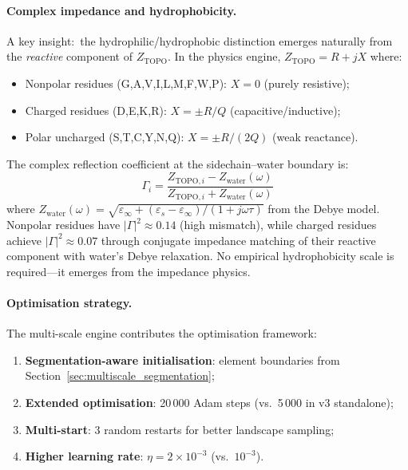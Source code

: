 \paragraph{Complex impedance and hydrophobicity.}
A key insight:\ the hydrophilic/hydrophobic distinction emerges naturally from the \emph{reactive} component of $Z_\text{TOPO}$.  In the physics engine, $Z_\text{TOPO} = R + jX$ where:
\begin{itemize}
    \item Nonpolar residues (G,A,V,I,L,M,F,W,P): $X = 0$ (purely resistive);
    \item Charged residues (D,E,K,R): $X = \pm R/Q$ (capacitive/inductive);
    \item Polar uncharged (S,T,C,Y,N,Q): $X = \pm R/(2Q)$ (weak reactance).
\end{itemize}
The complex reflection coefficient at the sidechain--water boundary is:
\begin{equation}
    \Gamma_i = \frac{Z_{\text{TOPO},i} - Z_\text{water}(\omega)}{Z_{\text{TOPO},i} + Z_\text{water}(\omega)}
    \label{eq:complex_gamma_hydro}
\end{equation}
where $Z_\text{water}(\omega) = \sqrt{\varepsilon_\infty + (\varepsilon_s - \varepsilon_\infty)/(1 + j\omega\tau)}$ from the Debye model.  Nonpolar residues have $|\Gamma|^2 \approx 0.14$ (high mismatch), while charged residues achieve $|\Gamma|^2 \approx 0.07$ through conjugate impedance matching of their reactive component with water's Debye relaxation.  No empirical hydrophobicity scale is required---it emerges from the impedance physics.

\paragraph{Optimisation strategy.}
The multi-scale engine contributes the optimisation framework:
\begin{enumerate}
    \item \textbf{Segmentation-aware initialisation}: element boundaries from Section~\ref{sec:multiscale_segmentation};
    \item \textbf{Extended optimisation}: 20\,000 Adam steps (vs.\ 5\,000 in v3 standalone);
    \item \textbf{Multi-start}: 3 random restarts for better landscape sampling;
    \item \textbf{Higher learning rate}: $\eta = 2 \times 10^{-3}$ (vs.\ $10^{-3}$).
\end{enumerate}


